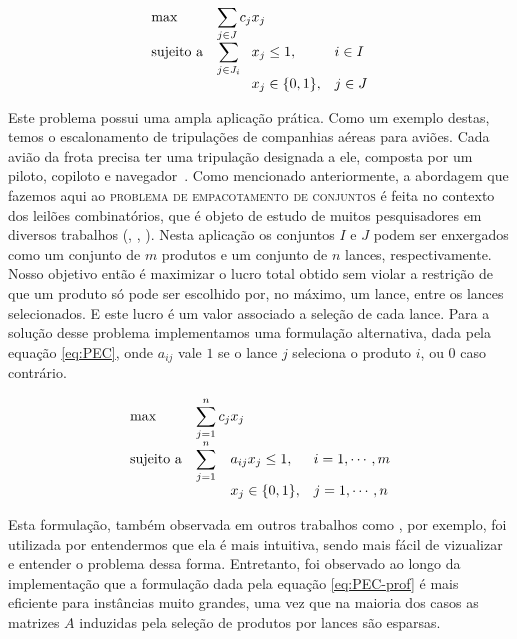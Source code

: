 \documentclass{article}
\begin{document}
	\begin{equation}
		\label{eq:PEC-prof}
        \begin{array}{ll@{}ll}
            \text{max}  & \displaystyle\sum\limits_{j \in J} c_{j}&x_{j} &\\
            \text{sujeito a}& \displaystyle\sum\limits_{j \in J_i}   &x_{j} \leq 1,  &i \in I\\
                 &                                                &x_{j} \in \{0,1\}, &j \in J
        \end{array}
    \end{equation}
    
	Este problema possui uma ampla aplicação prática. Como um exemplo destas, temos o escalonamento de tripulações de companhias aéreas para aviões. Cada avião da frota precisa ter uma tripulação designada a ele, composta por um piloto, copiloto e navegador~\cite{Airline}.    
    Como mencionado anteriormente, a abordagem que fazemos aqui ao \textsc{problema de empacotamento de conjuntos} é feita no contexto dos leilões combinatórios, que é objeto de estudo de muitos pesquisadores em diversos trabalhos (\cite{Winner}, \cite{Taming}, \cite{CABOB}). Nesta aplicação os conjuntos $I$ e $J$ podem ser enxergados como um conjunto de $m$ produtos e um conjunto de $n$ lances, respectivamente. Nosso objetivo então é maximizar o lucro total obtido sem violar a restrição de que um produto só pode ser escolhido por, no máximo, um lance, entre os lances selecionados. E este lucro é um valor associado a seleção de cada lance. 
    Para a solução desse problema implementamos uma formulação alternativa, dada pela equação \ref{eq:PEC}, onde $ a_{ij} $ vale $ 1 $ se o lance $ j $ seleciona o produto $ i $, ou $ 0 $ caso contrário.
    
    \begin{equation}
    	\label{eq:PEC}
    	\begin{array}{ll@{}ll}
    		\text{max}  & \displaystyle\sum\limits_{j = 1}^{n} c_{j} & x_{j} &\\
    		\text{sujeito a}& \displaystyle\sum\limits_{j = 1}^{n}   & a_{ij}x_{j} \leq 1,  & i=1,\cdots,m\\
    		&                                                &x_{j} \in \{0,1\}, & j = 1,\cdots,n
    	\end{array}
    \end{equation}
    
    Esta formulação, também observada em outros trabalhos como \cite{guo2005using}, por exemplo, foi utilizada por entendermos que ela é mais intuitiva, sendo mais fácil de vizualizar e entender o problema dessa forma. Entretanto, foi observado ao longo da implementação que a formulação dada pela equação \ref{eq:PEC-prof} é mais eficiente para instâncias muito grandes, uma vez que na maioria dos casos as matrizes $ A $ induzidas pela seleção de produtos por lances são esparsas. 
	
\end{document}
